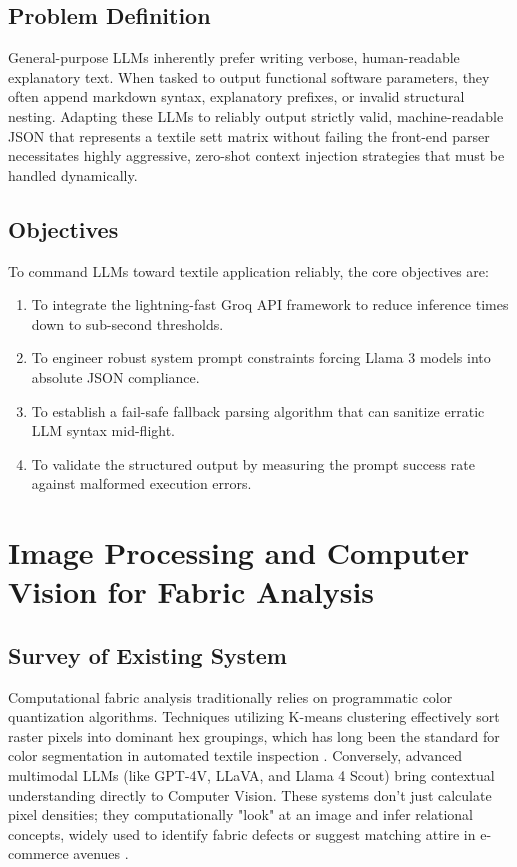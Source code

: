 \subsection{Problem Definition}
General-purpose LLMs inherently prefer writing verbose, human-readable explanatory text. When tasked to output functional software parameters, they often append markdown syntax, explanatory prefixes, or invalid structural nesting. Adapting these LLMs to reliably output strictly valid, machine-readable JSON that represents a textile sett matrix without failing the front-end parser necessitates highly aggressive, zero-shot context injection strategies that must be handled dynamically.

\subsection{Objectives}
To command LLMs toward textile application reliably, the core objectives are:
\begin{enumerate}
    \item To integrate the lightning-fast Groq API framework to reduce inference times down to sub-second thresholds.
    \item To engineer robust system prompt constraints forcing Llama 3 models into absolute JSON compliance.
    \item To establish a fail-safe fallback parsing algorithm that can sanitize erratic LLM syntax mid-flight.
    \item To validate the structured output by measuring the prompt success rate against malformed execution errors.
\end{enumerate}

\section{Image Processing and Computer Vision for Fabric Analysis}

\subsection{Survey of Existing System}
Computational fabric analysis traditionally relies on programmatic color quantization algorithms. Techniques utilizing K-means clustering effectively sort raster pixels into dominant hex groupings, which has long been the standard for color segmentation in automated textile inspection \cite{ref8}. Conversely, advanced multimodal LLMs (like GPT-4V, LLaVA, and Llama 4 Scout) bring contextual understanding directly to Computer Vision. These systems don't just calculate pixel densities; they computationally "look" at an image and infer relational concepts, widely used to identify fabric defects or suggest matching attire in e-commerce avenues \cite{ref7}.

